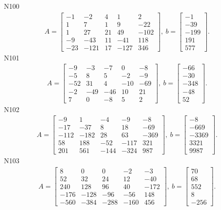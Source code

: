 \documentclass[11pt]{report}
\begin{document}
N100
\begin{align*}
 A = \left[\begin{matrix}-1 & -2 & 4 & 1 & 2\\1 & 7 & 1 & 9 & -22\\1 & 27 & 21 & 49 & -102\\-9 & -43 & 11 & -41 & 118\\-23 & -121 & 17 & -127 & 346\end{matrix}\right],
\ b = \left[\begin{matrix}-1\\-39\\-199\\191\\577\end{matrix}\right]. 
 \end{align*}
N101
\begin{align*}
 A = \left[\begin{matrix}-9 & -3 & -7 & 0 & -8\\-5 & 8 & 5 & -2 & -9\\-52 & 31 & 4 & -10 & -69\\-2 & -49 & -46 & 10 & 21\\7 & 0 & -8 & 5 & 2\end{matrix}\right],
\ b = \left[\begin{matrix}-66\\-30\\-348\\-48\\52\end{matrix}\right]. 
 \end{align*}
N102
\begin{align*}
 A = \left[\begin{matrix}-9 & 1 & -4 & -9 & -8\\-17 & -37 & 8 & 18 & -69\\-112 & -182 & 28 & 63 & -369\\58 & 188 & -52 & -117 & 321\\201 & 561 & -144 & -324 & 987\end{matrix}\right],
\ b = \left[\begin{matrix}-8\\-669\\-3369\\3321\\9987\end{matrix}\right]. 
 \end{align*}
N103
\begin{align*}
 A = \left[\begin{matrix}8 & 0 & 0 & -2 & -3\\52 & 32 & 24 & 12 & -40\\240 & 128 & 96 & 40 & -172\\-176 & -128 & -96 & -56 & 148\\-560 & -384 & -288 & -160 & 456\end{matrix}\right],
\ b = \left[\begin{matrix}70\\68\\552\\8\\-256\end{matrix}\right]. 
 \end{align*}
\end{document}
